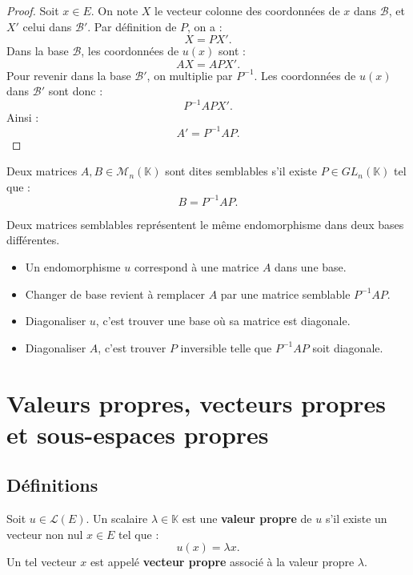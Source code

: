 \documentclass[11pt,a4paper]{article}
\newcommand{\K}{\mathbb K}
\newcommand{\M}{\mathcal M}
\newcommand{\Lcal}{\mathcal L}
\begin{document}
\begin{proof}
Soit \(x\in E\).  
On note \(X\) le vecteur colonne des coordonnées de \(x\) dans \(\mathcal B\), et \(X'\) celui dans \(\mathcal B'\).  
Par définition de \(P\), on a :
\[
X=PX'.
\]
Dans la base \(\mathcal B\), les coordonnées de \(u(x)\) sont :
\[
AX=APX'.
\]
Pour revenir dans la base \(\mathcal B'\), on multiplie par \(P^{-1}\).  
Les coordonnées de \(u(x)\) dans \(\mathcal B'\) sont donc :
\[
P^{-1}APX'.
\]
Ainsi :
\[
A'=P^{-1}AP.
\]
\end{proof}

\begin{definitionbox}
Deux matrices \(A,B\in\M_n(\K)\) sont dites semblables s'il existe \(P\in GL_n(\K)\) tel que :
\[
B=P^{-1}AP.
\]
\end{definitionbox}

\begin{retenirbox}
Deux matrices semblables représentent le même endomorphisme dans deux bases différentes.
\end{retenirbox}

\begin{methodbox}
\begin{itemize}
    \item Un endomorphisme \(u\) correspond à une matrice \(A\) dans une base.
    \item Changer de base revient à remplacer \(A\) par une matrice semblable \(P^{-1}AP\).
    \item Diagonaliser \(u\), c'est trouver une base où sa matrice est diagonale.
    \item Diagonaliser \(A\), c'est trouver \(P\) inversible telle que \(P^{-1}AP\) soit diagonale.
\end{itemize}
\end{methodbox}

\section{Valeurs propres, vecteurs propres et sous-espaces propres}

\subsection{Définitions}

\begin{definitionbox}
Soit \(u\in\Lcal(E)\).  
Un scalaire \(\lambda\in\K\) est une \textbf{valeur propre} de \(u\) s'il existe un vecteur non nul \(x\in E\) tel que :
\[
u(x)=\lambda x.
\]
Un tel vecteur \(x\) est appelé \textbf{vecteur propre} associé à la valeur propre \(\lambda\).
\end{definitionbox}
\end{document}
